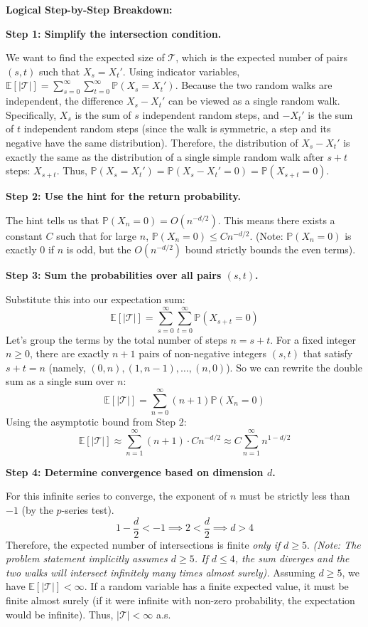 \begin{solution}
\textbf{Logical Step-by-Step Breakdown:}

\textbf{Step 1: Simplify the intersection condition.}

We want to find the expected size of $\mathcal{T}$, which is the expected number of pairs $(s, t)$ such that $X_s = X_t'$.
Using indicator variables, $\mathbb{E}[|\mathcal{T}|] = \sum_{s=0}^\infty \sum_{t=0}^\infty \mathbb{P}(X_s = X_t')$.
Because the two random walks are independent, the difference $X_s - X_t'$ can be viewed as a single random walk. Specifically, $X_s$ is the sum of $s$ independent random steps, and $-X_t'$ is the sum of $t$ independent random steps (since the walk is symmetric, a step and its negative have the same distribution).
Therefore, the distribution of $X_s - X_t'$ is exactly the same as the distribution of a single simple random walk after $s+t$ steps: $X_{s+t}$.
Thus, $\mathbb{P}(X_s = X_t') = \mathbb{P}(X_s - X_t' = 0) = \mathbb{P}(X_{s+t} = 0)$.

\textbf{Step 2: Use the hint for the return probability.}

The hint tells us that $\mathbb{P}(X_n = 0) = O(n^{-d/2})$.
This means there exists a constant $C$ such that for large $n$, $\mathbb{P}(X_n = 0) \leq C n^{-d/2}$.
(Note: $\mathbb{P}(X_n = 0)$ is exactly 0 if $n$ is odd, but the $O(n^{-d/2})$ bound strictly bounds the even terms).

\textbf{Step 3: Sum the probabilities over all pairs $(s, t)$.}

Substitute this into our expectation sum:
\[ \mathbb{E}[|\mathcal{T}|] = \sum_{s=0}^\infty \sum_{t=0}^\infty \mathbb{P}(X_{s+t} = 0) \]
Let's group the terms by the total number of steps $n = s+t$. For a fixed integer $n \geq 0$, there are exactly $n+1$ pairs of non-negative integers $(s, t)$ that satisfy $s+t = n$ (namely, $(0,n), (1,n-1), \dots, (n,0)$).
So we can rewrite the double sum as a single sum over $n$:
\[ \mathbb{E}[|\mathcal{T}|] = \sum_{n=0}^\infty (n+1) \mathbb{P}(X_n = 0) \]
Using the asymptotic bound from Step 2:
\[ \mathbb{E}[|\mathcal{T}|] \approx \sum_{n=1}^\infty (n+1) \cdot C n^{-d/2} \approx C \sum_{n=1}^\infty n^{1 - d/2} \]

\textbf{Step 4: Determine convergence based on dimension $d$.}

For this infinite series to converge, the exponent of $n$ must be strictly less than $-1$ (by the $p$-series test).
\[ 1 - \frac{d}{2} < -1 \implies 2 < \frac{d}{2} \implies d > 4 \]
Therefore, the expected number of intersections is finite \textit{only if} $d \geq 5$.
\textit{(Note: The problem statement implicitly assumes $d \geq 5$. If $d \leq 4$, the sum diverges and the two walks will intersect infinitely many times almost surely).}
Assuming $d \geq 5$, we have $\mathbb{E}[|\mathcal{T}|] < \infty$.
If a random variable has a finite expected value, it must be finite almost surely (if it were infinite with non-zero probability, the expectation would be infinite).
Thus, $|\mathcal{T}| < \infty$ a.s.
\end{solution}

